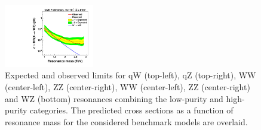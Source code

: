 \begin{figure}[h!tpb]
\begin{center}
\includegraphics[width=0.35\textwidth]{figs/limits/brazilianFlag_WZ_combined.pdf}
\end{center}
\caption{Expected and observed limits for qW (top-left), qZ (top-right), \GRS WW (center-left), \GRS ZZ (center-right), \GBulk WW (center-left), \GBulk ZZ (center-right) and WZ (bottom) resonances
 combining the low-purity and high-purity categories.
  The predicted cross sections as a function of resonance mass for the considered benchmark models are overlaid.}
\label{fig:Vtagresults3}
\end{figure}

